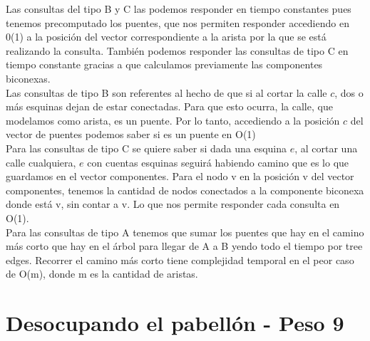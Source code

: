 \documentclass[a4paper]{article}
\begin{document}
Las consultas del tipo B y C las podemos responder en tiempo constantes pues tenemos precomputado los puentes, que nos permiten responder accediendo en 0(1) a la posición del vector correspondiente a la arista por la que se está realizando la consulta. También podemos responder las consultas de tipo C en tiempo constante gracias a que calculamos previamente las componentes biconexas.\\

Las consultas de tipo B son referentes al hecho de que si al cortar la calle $c$, dos o más esquinas dejan de estar conectadas. Para que esto ocurra, la calle, que modelamos como arista, es un puente. Por lo tanto, accediendo a la posición $c$ del vector de puentes podemos saber si es un puente en O(1)\\
\newpage
Para las consultas de tipo C se quiere saber si dada una esquina $e$, al cortar una calle cualquiera, $e$ con cuentas esquinas seguirá habiendo camino que es lo que guardamos en el vector componentes. Para el nodo v en la posición v del vector componentes, tenemos la cantidad de nodos conectados a la componente biconexa donde está v, sin contar a v.
Lo que nos permite responder cada consulta en O(1).\\

Para las consultas de tipo A tenemos que sumar los puentes que hay en el camino más corto que hay en el árbol para llegar de A a B yendo todo el tiempo por tree edges. Recorrer el camino más corto tiene complejidad temporal en el peor caso de O(m), donde m es la cantidad de aristas.\\






 
 












\pagebreak
\section{Desocupando el pabell\'on - Peso 9}
\end{document}

